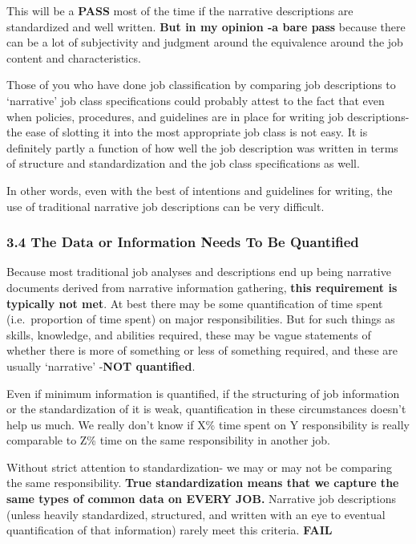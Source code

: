\documentclass[12pt,letterpaper]{article}
\begin{document}
{{This will be a \textbf{PASS} most of the time if the narrative
descriptions are standardized and well written. \textbf{But in my
opinion -a bare pass} because there can be a lot of subjectivity and
judgment around the equivalence around the job content and
characteristics.

Those of you who have done job classification by comparing job
descriptions to `narrative' job class specifications could probably
attest to the fact that even when policies, procedures, and guidelines
are in place for writing job descriptions- the ease of slotting it into
the most appropriate job class is not easy. It is definitely partly a
function of how well the job description was written in terms of
structure and standardization and the job class specifications as well.

In other words, even with the best of intentions and guidelines for
writing, the use of traditional narrative job descriptions can be very
difficult.

\subsubsection{\texorpdfstring{\textbf{3.4 The Data or Information Needs
To Be
Quantified}}{3.4 The Data or Information Needs To Be Quantified}}\label{the-data-or-information-needs-to-be-quantified}

Because most traditional job analyses and descriptions end up being
narrative documents derived from narrative information gathering,
\textbf{this requirement is typically not met}. At best there may be
some quantification of time spent (i.e.~proportion of time spent) on
major responsibilities. But for such things as skills, knowledge, and
abilities required, these may be vague statements of whether there is
more of something or less of something required, and these are usually
`narrative' -\textbf{NOT quantified}.

Even if minimum information is quantified, if the structuring of job
information or the standardization of it is weak, quantification in
these circumstances doesn't help us much. We really don't know if X\%
time spent on Y responsibility is really comparable to Z\% time on the
same responsibility in another job.

Without strict attention to standardization- we may or may not be
comparing the same responsibility. \textbf{True standardization means
that we capture the same types of common data on EVERY JOB.} Narrative
job descriptions (unless heavily standardized, structured, and written
with an eye to eventual quantification of that information) rarely meet
this criteria. \textbf{FAIL}

}}
\end{document}
